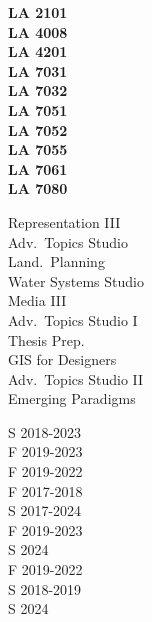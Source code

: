 \documentclass[10pt]{developercv}
\begin{document}

\printbibliography[title={\cvsect{Awards}\vspace*{-2em}}, keyword=awards, heading=subbibliography]



\begin{minipage}[t]{0.1\textwidth} 
\textbf{LA 2101}\\
\textbf{LA 4008}\\
\textbf{LA 4201}\\
\textbf{LA 7031}\\
\textbf{LA 7032}\\
\textbf{LA 7051}\\
\textbf{LA 7052}\\
\textbf{LA 7055}\\
\textbf{LA 7061}\\
\textbf{LA 7080}\\
\end{minipage}
\begin{minipage}[t]{0.24\textwidth} 
Representation III\\
Adv.~Topics Studio\\
Land.~Planning \\
Water Systems Studio\\
Media III\\
Adv.~Topics Studio I\\
Thesis Prep.\\
GIS for Designers\\
Adv.~Topics Studio II\\
Emerging Paradigms\\
\end{minipage}
\begin{minipage}[t]{0.17\textwidth} 
S 2018-2023\\
F 2019-2023\\
F 2019-2022\\
F 2017-2018\\
S 2017-2024\\
F 2019-2023\\
S 2024\\
F 2019-2022\\
S 2018-2019\\
S 2024\\
\end{minipage}
\end{document}
